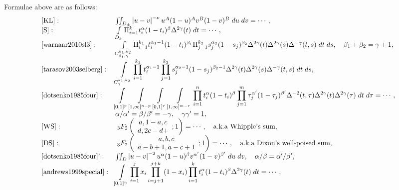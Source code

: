 \documentclass[a4paper,12pt]{article}
\begin{document}
Formulae above are as follows:\begin{equation*}
	\begin{array}[]{ll}
		\mbox{[KL]}:&\iint_{D_\pm}\myabs{u-v}^{-\nu}u^A(1-u)^Av^B(1-v)^B\;du\;dv=\cdots,\\
		\mbox{[S]}:&\int_{D_k}\Pi_{i=1}^kt_i^\alpha(1-t_i)^\beta\Delta^{2\gamma}(t)\;dt=\cdots,\\
		\mbox{\cite{warnaar2010sl3}}:&\int_{C_{\beta_1,\gamma}^{k_1,k_2}}\Pi_{i=1}^{k_1}t_i^{\alpha_1-1}(1-t_i)^{\beta_1}\Pi_{j=1}^{k_2}s_j^{\alpha_2}(1-s_j)^{\beta_2}
		\Delta^{2\gamma}(t)\Delta^{2\gamma}(s)\Delta^{-\gamma}(t,s)\;dt\;ds,\quad\beta_1+\beta_2=\gamma+1,\\
		\mbox{\cite{tarasov2003selberg}}:&\displaystyle\int_{C^{k_1,k_2}_{\gamma}}\prod_{i=1}^{k_1}t_i^{\alpha_1-1}\prod_{j=1}^{k_2}s_j^{\alpha_2-1}(1-s_j)^{\beta_2-1}\Delta^{2\gamma}(t)\Delta^{2\gamma}
		(s)\Delta^{-\gamma}(t,s)\;dt\;ds,\\
		\mbox{\cite{dotsenko1985four}}:&\displaystyle\int_{[0,1]^p}\int_{[1,\infty]^{n-p}}\int_{[0,1]^r}\int_{[1,\infty]^{m-r}}\prod_{i=1}^nt_i^\alpha(1-t_i)^\beta
		\prod_{j=1}^m\tau_j^{\alpha'}(1-\tau_j)^{\beta'}\Delta^{-2}(t,\tau)\Delta^{2\gamma}(t)\Delta^{2\gamma}(\tau)\;dt\;d\tau=\cdots,\\
		&{\alpha}/{\alpha'}={\beta}/{\beta'}=-\gamma,\quad\gamma\gamma'=1,\\
		\mbox{[WS]}:&\;_3F_2\left(\begin{array}[]{c}
			a,1-a,c\\ d,2c-d+
		\end{array};1\right)=\cdots,\quad\mbox{a.k.a Whipple's sum},\\
		\mbox{[DS]}:&\;_3F_2\left(\begin{array}[]{c}
			a,b,c\\a-b+1,a-c+1
		\end{array};1\right)=\cdots,\quad\mbox{a.k.a Dixon's well-poised sum},\\
		\mbox{\cite{dotsenko1985four}'}:&\iint_D\myabs{u-v}^{-2}u^\alpha(1-u)^\beta v^{\alpha'}(1-v)^{\beta'}\;du\;dv,\quad \alpha/\beta=\alpha'/\beta',\\
		\mbox{\cite{andrews1999special}}:&\displaystyle\int_{[0,1]^n}\prod_{i=1}^jx_i\prod_{i=j+1}^{j+k}(1-x_i)\prod_{i=1}^kt_i^\alpha(1-t_i)^\beta\Delta^{2\gamma}(t)\;dt=\cdots,
	\end{array}
\end{equation*}
\end{document}
